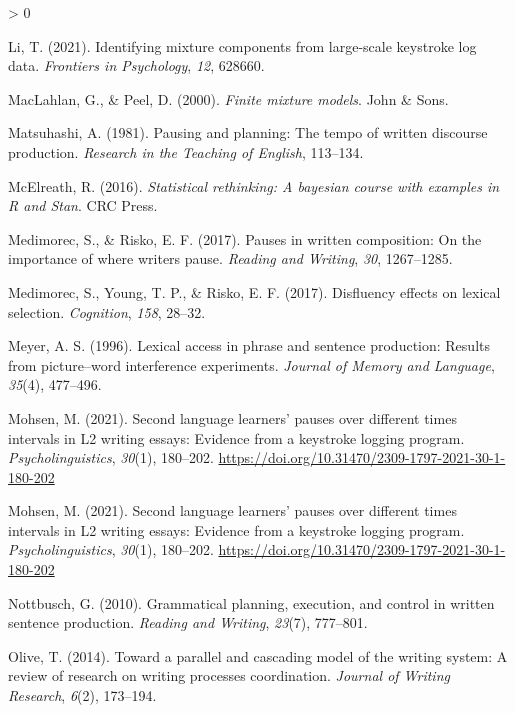 \documentclass[
  english,
  man,floatsintext]{apa7}
\newlength{\cslhangindent}
\newenvironment{CSLReferences}[2] %
 {%
  \setlength{\parindent}{0pt}
  \ifodd #1 \everypar{\setlength{\hangindent}{\cslhangindent}}\ignorespaces\fi
  \ifnum #2 > 0
  \setlength{\parskip}{#2\baselineskip}
  \fi
 }%
 {}
\begin{document}
\begin{CSLReferences}{1}{0}
\leavevmode\hypertarget{ref-li2021identifying}{}%
Li, T. (2021). Identifying mixture components from large-scale keystroke log data. \emph{Frontiers in Psychology}, \emph{12}, 628660.

\leavevmode\hypertarget{ref-peel2000finite}{}%
MacLahlan, G., \& Peel, D. (2000). \emph{Finite mixture models}. John \& Sons.

\leavevmode\hypertarget{ref-matsuhashi1981pausing}{}%
Matsuhashi, A. (1981). Pausing and planning: The tempo of written discourse production. \emph{Research in the Teaching of English}, 113--134.

\leavevmode\hypertarget{ref-mcelreath2016statistical}{}%
McElreath, R. (2016). \emph{Statistical rethinking: {A} bayesian course with examples in {R} and {Stan}}. CRC Press.

\leavevmode\hypertarget{ref-medimorec2017pauses}{}%
Medimorec, S., \& Risko, E. F. (2017). Pauses in written composition: On the importance of where writers pause. \emph{Reading and Writing}, \emph{30}, 1267--1285.

\leavevmode\hypertarget{ref-medimorec2017disfluency}{}%
Medimorec, S., Young, T. P., \& Risko, E. F. (2017). Disfluency effects on lexical selection. \emph{Cognition}, \emph{158}, 28--32.

\leavevmode\hypertarget{ref-meyer1996}{}%
Meyer, A. S. (1996). Lexical access in phrase and sentence production: Results from picture--word interference experiments. \emph{Journal of Memory and Language}, \emph{35}(4), 477--496.

\leavevmode\hypertarget{ref-mohsen2021second}{}%
Mohsen, M. (2021). Second language learners' pauses over different times intervals in {L2} writing essays: Evidence from a keystroke logging program. \emph{Psycholinguistics}, \emph{30}(1), 180--202. \url{https://doi.org/10.31470/2309-1797-2021-30-1-180-202}

\leavevmode\hypertarget{ref-mohsen2021second}{}%
Mohsen, M. (2021). Second language learners' pauses over different times intervals in {L2} writing essays: Evidence from a keystroke logging program. \emph{Psycholinguistics}, \emph{30}(1), 180--202. \url{https://doi.org/10.31470/2309-1797-2021-30-1-180-202}

\leavevmode\hypertarget{ref-not10}{}%
Nottbusch, G. (2010). Grammatical planning, execution, and control in written sentence production. \emph{Reading and Writing}, \emph{23}(7), 777--801.

\leavevmode\hypertarget{ref-olive2014toward}{}%
Olive, T. (2014). Toward a parallel and cascading model of the writing system: {A} review of research on writing processes coordination. \emph{Journal of Writing Research}, \emph{6}(2), 173--194.


\end{CSLReferences}
\end{document}
